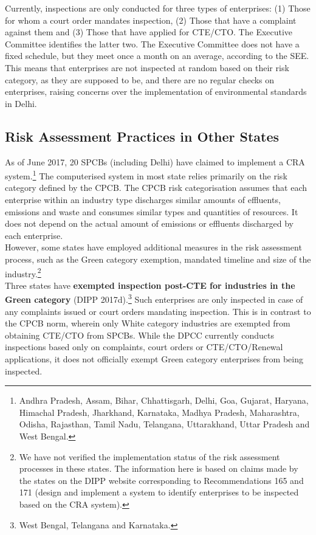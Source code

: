 \documentclass[a4paper, 12pt]{article}
\begin{document}
	Currently, inspections are only conducted for three types of enterprises: (1) Those for whom a court order mandates inspection, (2) Those that have a complaint against them and (3) Those that have applied for CTE/CTO. The Executive Committee identifies the latter two. The Executive Committee does not have a fixed schedule, but they meet once a month on an average, according to the SEE. This means that enterprises are not inspected at random based on their risk category, as they are supposed to be, and there are no regular checks on enterprises, raising concerns over the implementation of environmental standards in Delhi. \\
	
	\subsection{Risk Assessment Practices in Other States}
	
	As of June 2017, 20 SPCBs (including Delhi) have claimed to implement a CRA system.\footnote{Andhra Pradesh, Assam, Bihar, Chhattisgarh, Delhi, Goa, Gujarat, Haryana, Himachal Pradesh, Jharkhand, Karnataka, Madhya Pradesh, Maharashtra, Odisha, Rajasthan, Tamil Nadu, Telangana, Uttarakhand, Uttar Pradesh and West Bengal.} The computerised system in most state relies primarily on the risk category defined by the CPCB. The CPCB risk categorisation assumes that each enterprise within an industry type discharges similar amounts of effluents, emissions and waste and consumes similar types and quantities of resources. It does not depend on the actual amount of emissions or effluents discharged by each enterprise. \\
	
	However, some states have employed additional measures in the risk assessment process, such as the Green category exemption, mandated timeline and size of the industry.\footnote{We have not verified the implementation status of the risk assessment processes in these states. The information here is based on claims made by the states on the DIPP website corresponding to Recommendations 165 and 171 (design and implement a system to identify enterprises to be inspected based on the CRA system).} \\
	
	Three states have \textbf{exempted inspection post-CTE for industries in the Green category} (DIPP 2017d).\footnote{West Bengal, Telangana and Karnataka.} Such enterprises are only inspected in case of any complaints issued or court orders mandating inspection. This is in contrast to the CPCB norm, wherein only White category industries are exempted from obtaining CTE/CTO from SPCBs. While the DPCC currently conducts inspections based only on complaints, court orders or CTE/CTO/Renewal applications, it does not officially exempt Green category enterprises from being inspected. \\
	
\end{document}
